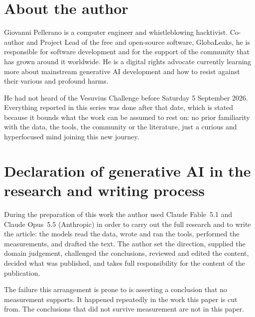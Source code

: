 
\section*{About the author}

Giovanni Pellerano is a computer engineer and whistleblowing hacktivist.
Co-author and Project Lead of the free and open-source software, GlobaLeaks, he
is responsible for software development and for the support of the community that has grown
around it worldwide. He is a digital rights advocate currently learning more about mainstream
generative AI development and how to resist against their various and profound harms.

He had not heard of the Vesuvius Challenge before Saturday 5 September 2026. Everything reported
in this series was done after that date, which is stated because it bounds what the work can be
assumed to rest on: no prior familiarity with the data, the tools, the community or the
literature, just a curious and hyperfocused mind joining this new journey.

\section*{Declaration of generative AI in the research and writing process}

During the preparation of this work the author used Claude Fable~5.1 and Claude Opus~5.5 (Anthropic) in order
to carry out the full research and to write the article: the models read the data, wrote and ran the tools,
performed the measurements, and drafted the text. The author set the direction, supplied the
domain judgement, challenged the conclusions, reviewed and edited the content, decided what was
published, and takes full responsibility for the content of the publication.

The failure this arrangement is prone to is asserting a conclusion that no measurement supports.
It happened repeatedly in the work this paper is cut from. The conclusions that did not survive
measurement are not in this paper.

